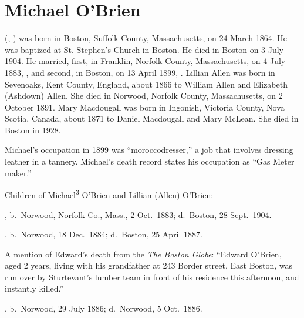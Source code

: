 \section{Michael O'Brien}

 (, ) was born in Boston, Suffolk County, Massachusetts, on 24 March 1864.\cite{Michael3OBrienBirth} He was baptized at St. Stephen's Church in Boston.\cite{Michael3OBrienBaptism} He died in Boston on 3 July 1904.\cite{Michael3OBrienBirth} He married, first, in Franklin, Norfolk County, Massachusetts, on 4 July 1883, ,\cite{LillianAllenMarriage} and second, in Boston, on 13 April 1899, .\cite{MaryMacdougallMarriage} Lillian Allen was born in Sevenoaks, Kent County, England, about 1866 to William Allen and Elizabeth (Ashdown) Allen.\cite{LillianAllenMarriage,ElizabethAshdownDeath} She died in Norwood, Norfolk County, Massachusetts, on 2 October 1891.\cite{LillianAllenDeath} Mary Macdougall was born in Ingonish, Victoria County, Nova Scotia, Canada, about 1871 to Daniel Macdougall and Mary McLean.\cite{MaryMacdougallMarriage} She died in Boston in 1928.\cite{MaryMacdougallDeath}

Michael's occupation in 1899 was ``moroccodresser,''\cite{MaryMacdougallMarriage} a job that involves dressing leather in a tannery.\cite{moroccodresser} Michael's death record states his occupation as ``Gas Meter maker.''\cite{Michael3OBrienDeath} 

\begin{KidsIntro}
	Children of Michael\textsuperscript{3} O'Brien and Lillian (Allen) O'Brien:
\end{KidsIntro}

\begin{Kids}
	
	, b.\ Norwood, Norfolk Co., Mass., 2 Oct.\ 1883;\cite{Arthur4OBrienBirth} d.\ Boston, 28 Sept.\ 1904.\cite{Arthur4OBrienDeath}
	
	, b.\ Norwood, 18 Dec.\ 1884;\cite{Edward4OBrienBirth} d.\ Boston, 25 April 1887.\cite{Edward4OBrienDeath}
	
	\begin{KidsMoreText}
		A mention of Edward's death from the \textit{The Boston Globe}: ``Edward O'Brien, aged 2 years, living with his grandfather at 243 Border street, East Boston, was run over by Sturtevant's lumber team in front of his residence this afternoon, and instantly killed.''\cite{Edward4OBrienDeath2}
	\end{KidsMoreText}
	
	, b.\ Norwood, 29 July 1886;\cite{Elizabeth4OBrienBirth} d.\ Norwood, 5 Oct.\ 1886.\cite{Elizabeth4OBrienDeath}
	
\end{Kids}

